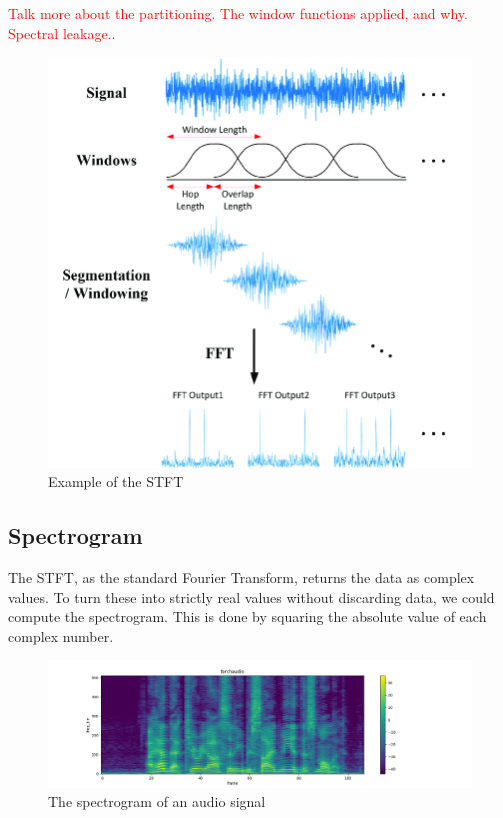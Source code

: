 \textcolor{red}{Talk more about the partitioning. The window functions applied, and why. Spectral leakage..}

\begin{figure}[H]
    \centering
    \includegraphics[scale=0.35]{figures/stft}
    \caption{Example of the \gls{STFT}}
    \label{STFTFigure}
\end{figure}

\subsection{Spectrogram}

The \gls{STFT}, as the standard Fourier Transform, returns the data as complex values. To turn these into strictly real values without discarding data, we could compute the spectrogram. This is done by squaring the absolute value of each complex number. 

\begin{figure}[H]
    \centering
    \includegraphics[scale=0.35]{figures/spectrogram}
    \caption{The spectrogram of an audio signal}
    \label{SpectrogramFigure}
\end{figure}

